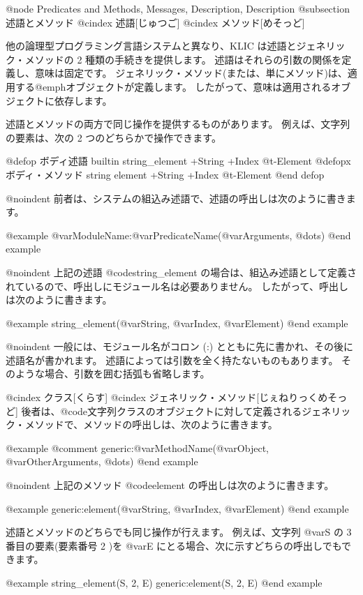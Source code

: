 @node Predicates and Methods, Messages, Description, Description
@subsection 述語とメソッド
@cindex 述語[じゅつご]
@cindex メソッド[めそっど]

他の論理型プログラミング言語システムと異なり、KLIC は述語とジェネリック・メソッドの 2 種類の手続きを提供します。
述語はそれらの引数の関係を定義し、意味は固定です。
ジェネリック・メソッド(または、単にメソッド)は、適用する@emph{オブジェクト}が定義します。
したがって、意味は適用されるオブジェクトに依存します。

述語とメソッドの両方で同じ操作を提供するものがあります。
例えば、文字列の要素は、次の 2 つのどちらかで操作できます。

@defop {ボディ述語} {builtin} string_element +String +Index @t{-}Element
@defopx {ボディ・メソッド} string element +String +Index @t{-}Element
@end defop

@noindent
前者は、システムの組込み述語で、述語の呼出しは次のように書きます。

@example
@var{ModuleName}:@var{PredicateName}(@var{Arguments}, @dots{})
@end example

@noindent
上記の述語 @code{string_element} の場合は、組込み述語として定義されているので、呼出しにモジュール名は必要ありません。
したがって、呼出しは次のように書きます。

@example
string_element(@var{String}, @var{Index}, @var{Element})
@end example

@noindent
一般には、モジュール名がコロン (:) とともに先に書かれ、その後に述語名が書かれます。
述語によっては引数を全く持たないものもあります。
そのような場合、引数を囲む括弧も省略します。

@cindex クラス[くらす]
@cindex ジェネリック・メソッド[じぇねりっくめそっど]
後者は、@code{文字列}クラスのオブジェクトに対して定義されるジェネリック・メソッドで、メソッドの呼出しは、次のように書きます。

@example
@comment %
generic:@var{MethodName}(@var{Object}, @var{OtherArguments}, @dots{})
@end example

@noindent
上記のメソッド @code{element} の呼出しは次のように書きます。

@example
generic:element(@var{String}, @var{Index}, @var{Element})
@end example

述語とメソッドのどちらでも同じ操作が行えます。
例えば、文字列 @var{S} の 3 番目の要素(要素番号 2 )を @var{E} にとる場合、次に示すどちらの呼出しでもできます。

@example
string_element(S, 2, E)
generic:element(S, 2, E)
@end example

